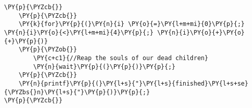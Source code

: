 \begin{Verbatim}[commandchars=\\\{\}]
        \PY{p}{\PYZcb{}}
    \PY{p}{\PYZcb{}}
    \PY{k}{for}\PY{p}{(}\PY{n}{i} \PY{o}{=}\PY{l+m+mi}{0}\PY{p}{;} \PY{n}{i}\PY{o}{<}\PY{l+m+mi}{4}\PY{p}{;} \PY{n}{i}\PY{o}{+}\PY{o}{+}\PY{p}{)}
    \PY{p}{\PYZob{}}
        \PY{c+c1}{//Reap the souls of our dead children}
        \PY{n}{wait}\PY{p}{(}\PY{p}{)}\PY{p}{;}
    \PY{p}{\PYZcb{}}
    \PY{n}{printf}\PY{p}{(}\PY{l+s}{"}\PY{l+s}{finished}\PY{l+s+se}{\PYZbs{}n}\PY{l+s}{"}\PY{p}{)}\PY{p}{;}
\PY{p}{\PYZcb{}}
\end{Verbatim}
